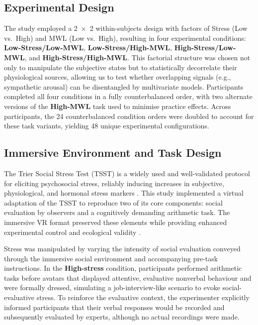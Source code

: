 \documentclass[lettersize,journal]{IEEEtran}
\begin{document}
\subsection{Experimental Design}
The study employed a 2~\(\times\)~2 within-subjects design with factors of Stress (Low vs.\ High) and MWL (Low vs.\ High), resulting in four experimental conditions: \textbf{Low-Stress/Low-MWL}, \textbf{Low-Stress/High-MWL}, 
\textbf{High-Stress/Low-MWL}, and \textbf{High-Stress/High-MWL}. This factorial structure was chosen not only to manipulate the subjective states but to statistically decorrelate their physiological sources, allowing us to test whether overlapping signals (e.g., sympathetic arousal) can be disentangled by multivariate models.
 Participants completed all four conditions in a fully counterbalanced order, with two alternate versions of the \textbf{High-MWL} task used to minimise practice effects. Across participants, the 24 counterbalanced condition orders were doubled to account for these task variants, yielding 48 unique experimental configurations.

\subsection{Immersive Environment and Task Design}
\label{sec:immersive_env_task}
The Trier Social Stress Test (TSST) is a widely used and well-validated protocol for eliciting psychosocial stress, reliably inducing increases in subjective, physiological, and hormonal stress markers \cite{goodmanMetaanalyticalAssessmentEffects2017, vanhollebekeNeuralCorrelatesPsychosocial2022a}. This study implemented a virtual adaptation of the TSST to reproduce two of its core components: social evaluation by observers and a cognitively demanding arithmetic task. The immersive VR format preserved these elements while providing enhanced experimental control and ecological validity \cite{helminenStressReactivityTrier2021}.

Stress was manipulated by varying the intensity of social evaluation conveyed through the immersive social environment and accompanying pre-task instructions. In the \textbf{High-stress} condition, participants performed arithmetic tasks before avatars that displayed attentive, evaluative nonverbal behaviour and were formally dressed, simulating a job-interview-like scenario to evoke social-evaluative stress. To reinforce the evaluative context, the experimenter explicitly informed participants that their verbal responses would be recorded and subsequently evaluated by experts, although no actual recordings were made. 
\end{document}
